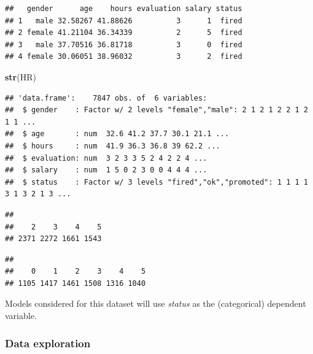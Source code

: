 \documentclass[12pt,]{krantz}
\newenvironment{Shaded}{\begin{snugshade}}{\end{snugshade}}
\newcommand{\KeywordTok}[1]{\textcolor[rgb]{0.13,0.29,0.53}{\textbf{#1}}}
\newcommand{\NormalTok}[1]{#1}
\newcommand{\OperatorTok}[1]{\textcolor[rgb]{0.81,0.36,0.00}{\textbf{#1}}}
\begin{document}
\begin{verbatim}
##   gender      age    hours evaluation salary status
## 1   male 32.58267 41.88626          3      1  fired
## 2 female 41.21104 36.34339          2      5  fired
## 3   male 37.70516 36.81718          3      0  fired
## 4 female 30.06051 38.96032          3      2  fired
\end{verbatim}

\begin{Shaded}
\begin{Highlighting}[]
\KeywordTok{str}\NormalTok{(HR)}
\end{Highlighting}
\end{Shaded}

\begin{verbatim}
## 'data.frame':    7847 obs. of  6 variables:
##  $ gender    : Factor w/ 2 levels "female","male": 2 1 2 1 2 2 1 2 1 1 ...
##  $ age       : num  32.6 41.2 37.7 30.1 21.1 ...
##  $ hours     : num  41.9 36.3 36.8 39 62.2 ...
##  $ evaluation: num  3 2 3 3 5 2 4 2 2 4 ...
##  $ salary    : num  1 5 0 2 3 0 0 4 4 4 ...
##  $ status    : Factor w/ 3 levels "fired","ok","promoted": 1 1 1 1 3 1 3 2 1 3 ...
\end{verbatim}

\begin{Shaded}
\end{Shaded}

\begin{verbatim}
## 
##    2    3    4    5 
## 2371 2272 1661 1543
\end{verbatim}

\begin{Shaded}
\end{Shaded}

\begin{verbatim}
## 
##    0    1    2    3    4    5 
## 1105 1417 1461 1508 1316 1040
\end{verbatim}

Models considered for this dataset will use \emph{status} as the (categorical) dependent variable.

\hypertarget{exploration-HR}{%
\subsubsection{Data exploration}\label{exploration-HR}}
\end{document}

